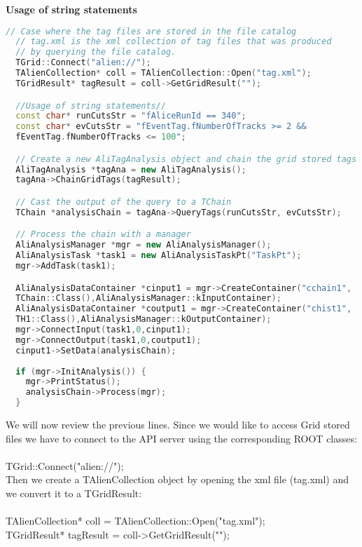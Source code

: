 \vspace{0.5 cm}
\textbf{Usage of string statements}
\begin{lstlisting}[language=C++]
  // Case where the tag files are stored in the file catalog
  // tag.xml is the xml collection of tag files that was produced 
  // by querying the file catalog.
  TGrid::Connect("alien://"); 
  TAlienCollection* coll = TAlienCollection::Open("tag.xml");
  TGridResult* tagResult = coll->GetGridResult("");

  //Usage of string statements//
  const char* runCutsStr = "fAliceRunId == 340";
  const char* evCutsStr = "fEventTag.fNumberOfTracks >= 2 &&
  fEventTag.fNumberOfTracks <= 100";

  // Create a new AliTagAnalysis object and chain the grid stored tags
  AliTagAnalysis *tagAna = new AliTagAnalysis(); 
  tagAna->ChainGridTags(tagResult);

  // Cast the output of the query to a TChain
  TChain *analysisChain = tagAna->QueryTags(runCutsStr, evCutsStr);

  // Process the chain with a manager
  AliAnalysisManager *mgr = new AliAnalysisManager();
  AliAnalysisTask *task1 = new AliAnalysisTaskPt("TaskPt");
  mgr->AddTask(task1);

  AliAnalysisDataContainer *cinput1 = mgr->CreateContainer("cchain1",
  TChain::Class(),AliAnalysisManager::kInputContainer);
  AliAnalysisDataContainer *coutput1 = mgr->CreateContainer("chist1", 
  TH1::Class(),AliAnalysisManager::kOutputContainer);
  mgr->ConnectInput(task1,0,cinput1);
  mgr->ConnectOutput(task1,0,coutput1);
  cinput1->SetData(analysisChain);
  
  if (mgr->InitAnalysis()) {
    mgr->PrintStatus();
    analysisChain->Process(mgr);
  }
\end{lstlisting}


\noindent We will now review the previous lines. Since we would like to access Grid stored files we have to connect to the API server using the corresponding ROOT classes:\\
\\
{\ttfamily TGrid::Connect("alien://");}\\

Then we create a {\ttfamily TAlienCollection} object by opening the xml file (tag.xml) and we convert it to a {\ttfamily TGridResult}:\\
\\
{\ttfamily TAlienCollection* coll = TAlienCollection::Open("tag.xml");}\\
{\ttfamily TGridResult* tagResult = coll->GetGridResult("");}\\


